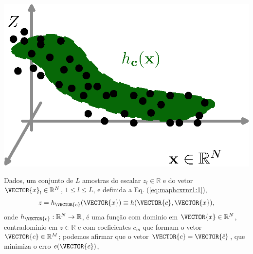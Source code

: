 \begin{theorem}
\label{theo:maphcxrnr1}
~\\
\begin{minipage}{0.4\textwidth}
\centering
\includegraphics[width=0.95\linewidth]{chapters/mapeamento/mapeamento-hxn-nonlinear.eps} 
\end{minipage}
\begin{minipage}{0.6\textwidth}
Dados, um conjunto de $L$ amostras
do escalar $z_l \in \mathbb{R}$ e do vetor $\VECTOR{x}_l \in \mathbb{R}^N$, $1\leq l\leq L$, e 
definida a Eq. (\ref{eq:maphcxrnr1:1}), 
\begin{equation}\label{eq:maphcxrnr1:1}
z=h_{\VECTOR{c}}(\VECTOR{x})\equiv h(\VECTOR{c},\VECTOR{x}),
\end{equation}
onde $h_{\VECTOR{c}}:\mathbb{R}^N \rightarrow \mathbb{R}$, 
é uma função com dominio em  $\VECTOR{x} \in \mathbb{R}^N$, contradominio em $z\in \mathbb{R}$
e com coeficientes $c_m$ que formam o vetor $\VECTOR{c}\in \mathbb{R}^{M}$;
podemos afirmar que o vetor $\VECTOR{c}=\VECTOR{\hat{c}}$,
que minimiza o erro $e(\VECTOR{c})$,
\end{minipage}


\end{theorem}
